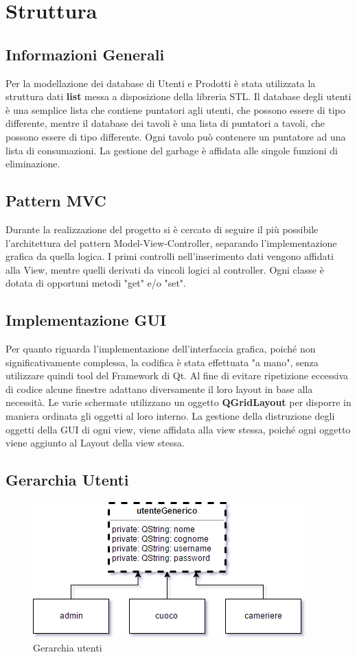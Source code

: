 \section{Struttura}
\subsection{Informazioni Generali}
Per la modellazione dei database di Utenti e Prodotti è stata utilizzata la struttura dati
\textbf{list} messa a disposizione della libreria STL.
Il database degli utenti è una semplice lista che contiene puntatori agli utenti, che possono essere di tipo differente, mentre il database dei tavoli è una lista di puntatori a tavoli, che possono essere di tipo differente. Ogni tavolo può contenere un puntatore ad una lista di consumazioni.
La gestione del garbage è affidata alle singole funzioni di eliminazione.

\subsection{Pattern MVC}
Durante la realizzazione del progetto si è cercato di seguire il più possibile l'architettura del pattern Model-View-Controller, separando l'implementazione grafica da quella logica. 
I primi controlli nell'inserimento dati vengono affidati alla View, mentre quelli derivati da vincoli logici al controller.
Ogni classe è dotata di opportuni metodi "get" e/o "set".

\subsection{Implementazione GUI}
Per quanto riguarda l'implementazione dell'interfaccia grafica, poiché non significativamente complessa, la codifica è stata effettuata "a mano", senza utilizzare quindi tool del Framework di Qt.
Al fine di evitare ripetizione eccessiva di codice alcune finestre adattano diversamente il loro layout in base alla necessità.
Le varie schermate utilizzano
un oggetto \textbf{QGridLayout} per disporre in maniera ordinata gli
oggetti al loro interno.
La gestione della distruzione degli oggetti della GUI di ogni view, viene affidata alla view stessa, poiché ogni oggetto viene aggiunto al Layout della view stessa.

\subsection{Gerarchia Utenti}
\begin{figure}[htbp]
\centering
\includegraphics[scale=0.7]{res/sections/immagini/utenti.png}
\caption{Gerarchia utenti}
\end{figure}

